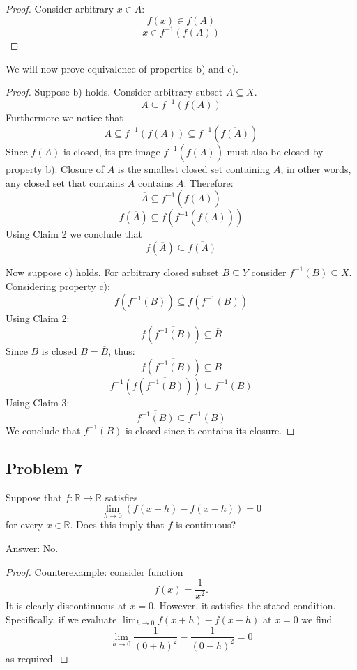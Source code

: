\documentclass{article}
\begin{document}
\begin{proof}
Consider arbitrary $x \in A$:
$$ f(x) \in f(A) $$
$$ x \in f^{-1}(f(A)) $$
\end{proof}

We will now prove equivalence of properties b) and c).
\begin{proof}
Suppose b) holds. Consider arbitrary subset $A \subseteq X$. 
$$ A \subseteq f^{-1}(f(A)) $$
Furthermore we notice that
$$ A \subseteq f^{-1}(f(A)) \subseteq f^{-1}(\overline{f(A)}) $$
Since $\overline{f(A)}$ is closed, its pre-image $f^{-1}(\overline{f(A)})$ must also be closed by property b). Closure of $A$ is the smallest closed set containing $A$, in other words, any closed set that contains $A$ contains $\overline{A}$. Therefore:
$$ \overline{A} \subseteq f^{-1}(\overline{f(A)}) $$
$$ f(\overline{A}) \subseteq f(f^{-1}(\overline{f(A)})) $$
Using Claim 2 we conclude that
$$ f(\overline{A}) \subseteq \overline{f(A)} $$

Now suppose c) holds. For arbitrary closed subset $B \subseteq Y$ consider $f^{-1}(B) \subseteq X$. Considering property c):
$$ f(\overline{f^{-1}(B)}) \subseteq \overline{f(f^{-1}(B))} $$
Using Claim 2:
$$ f(\overline{f^{-1}(B)}) \subseteq \overline{B} $$
Since $B$ is closed $B = \overline{B}$, thus:
$$ f(\overline{f^{-1}(B)}) \subseteq B $$
$$ f^{-1}(f(\overline{f^{-1}(B)})) \subseteq f^{-1}(B) $$
Using Claim 3:
$$ \overline{f^{-1}(B)} \subseteq f^{-1}(B) $$
We conclude that $f^{-1}(B)$ is closed since it contains its closure.

\end{proof}


\subsection*{Problem 7}

\begin{tcolorbox}
Suppose that $f : \mathbb{R} \to \mathbb{R}$ satisfies
$$ \lim_{h \to 0} (f(x+h)-f(x-h)) = 0 $$
for every $x \in \mathbb{R}$. Does this imply that $f$ is continuous?
\end{tcolorbox}
Answer: No.
\begin{proof}
Counterexample: consider function
$$ f(x) = \frac{1}{x^2}. $$
It is clearly discontinuous at $x=0$. However, it satisfies the stated condition. Specifically, if we evaluate $\lim_{h \to 0} f(x+h)-f(x-h)$ at $x=0$ we find
$$ \lim_{h \to 0} \frac{1}{(0+h)^2} - \frac{1}{(0-h)^2} = 0 $$
as required.

\end{proof}
\end{document}
